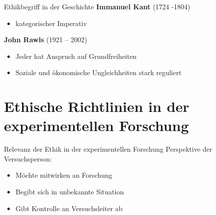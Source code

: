 \documentclass[10pt]{beamer}
\begin{document}
	\begin{frame}{Ethikbegriff in der Geschichte}
		\textbf{Immanuel Kant} (1724 -1804)
		\begin{itemize}
			\item kategorischer Imperativ
		\end{itemize}
		
		\textbf{John Rawls} (1921 – 2002) 
		\begin{itemize}
			\item Jeder hat Anspruch auf Grundfreiheiten
			\item Soziale und ökonomische Ungleichheiten stark reguliert
		\end{itemize}
	\end{frame}
\section{Ethische Richtlinien in der experimentellen Forschung}
	\begin{frame}{Relevanz der Ethik in der experimentellen Forschung}
		Perspektive der Versuchsperson:
		\begin{itemize}
		\item Möchte mitwirken an Forschung	%
		\item Begibt sich in unbekannte Situation
		\item Gibt Kontrolle an Versuchsleiter ab %
		\end{itemize}
		
	\end{frame}
	
\end{document}

